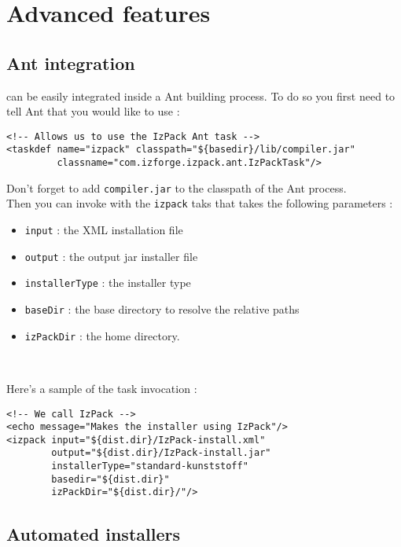 \chapter{Advanced features}

\section{Ant integration}

\IzPack can be easily integrated inside a Ant building process. To do so you
first need to tell Ant that you would like to use \IzPack :
\footnotesize
\begin{verbatim}
<!-- Allows us to use the IzPack Ant task -->
<taskdef name="izpack" classpath="${basedir}/lib/compiler.jar"
         classname="com.izforge.izpack.ant.IzPackTask"/>
\end{verbatim}
\normalsize

Don't forget to add \texttt{compiler.jar} to the classpath of the Ant process.\\

Then you can invoke \IzPack with the \texttt{izpack} taks that takes the
following parameters :
\begin{itemize}

  \item \texttt{input} : the XML installation file
  \item \texttt{output} : the output jar installer file
  \item \texttt{installerType} : the installer type
  \item \texttt{baseDir} : the base directory to resolve the relative paths
  \item \texttt{izPackDir} : the \IzPack home directory.
  
\end{itemize}\

Here's a sample of the task invocation :\\
\footnotesize
\begin{verbatim}
<!-- We call IzPack -->
<echo message="Makes the installer using IzPack"/>
<izpack input="${dist.dir}/IzPack-install.xml"
        output="${dist.dir}/IzPack-install.jar"
        installerType="standard-kunststoff"
        basedir="${dist.dir}"
        izPackDir="${dist.dir}/"/>
\end{verbatim}
\normalsize

\section{Automated installers}

